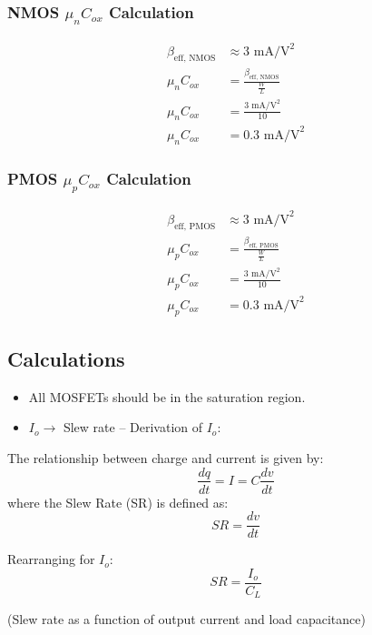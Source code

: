 \subsubsection{NMOS $\mu_n C_{ox}$ Calculation}
\begin{align*}
    \beta_{\text{eff, NMOS}} &\approx 3 \text{ mA/V}^2 \\
    \mu_n C_{ox} &= \frac{\beta_{\text{eff, NMOS}}}{\frac{W}{L}} \\
    \mu_n C_{ox} &= \frac{3 \text{ mA/V}^2}{10} \\
    \mu_n C_{ox} &= 0.3 \text{ mA/V}^2
\end{align*}

\subsubsection{PMOS $\mu_p C_{ox}$ Calculation}
\begin{align*}
    \beta_{\text{eff, PMOS}} &\approx 3 \text{ mA/V}^2 \\
    \mu_p C_{ox} &= \frac{\beta_{\text{eff, PMOS}}}{\frac{W}{L}} \\
    \mu_p C_{ox} &= \frac{3 \text{ mA/V}^2}{10} \\
    \mu_p C_{ox} &= 0.3 \text{ mA/V}^2
\end{align*}

\subsection{Calculations}
\begin{itemize}
    \item All MOSFETs should be in the saturation region.
    \item $I_o \rightarrow$ Slew rate – Derivation of $I_o$:
\end{itemize}

The relationship between charge and current is given by:
\begin{equation}
    \frac{dq}{dt} = I = C \frac{dv}{dt}
\end{equation}
where the Slew Rate (SR) is defined as:
\begin{equation}
    SR = \frac{dv}{dt}
\end{equation}

Rearranging for $I_o$:
\begin{equation}
    SR = \frac{I_o}{C_L}
\end{equation}

(Slew rate as a function of output current and load capacitance)

